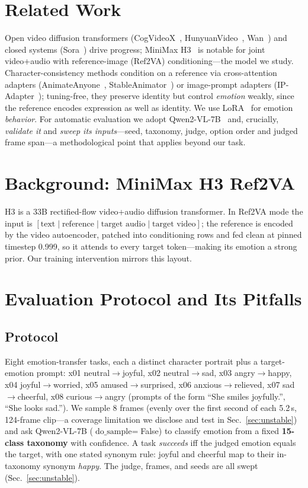 \documentclass[conference]{IEEEtran}
\begin{document}
\section{Related Work}
Open video diffusion transformers (CogVideoX~\cite{cogvideox2024}, HunyuanVideo~\cite{hunyuan2024},
Wan~\cite{wan2025}) and closed systems (Sora~\cite{sora2024}) drive progress; MiniMax
H3~\cite{minimax2025} is notable for joint video+audio with reference-image (Ref2VA) conditioning---the
model we study. Character-consistency methods condition on a reference via cross-attention adapters
(AnimateAnyone~\cite{animateanyone2023}, StableAnimator~\cite{stableanimator2024}) or image-prompt
adapters (IP-Adapter~\cite{ipadapter2023}); tuning-free, they preserve identity but control
\emph{emotion} weakly, since the reference encodes expression as well as identity. We use
LoRA~\cite{lora2021,dreambooth2022} for emotion \emph{behavior}. For automatic evaluation we adopt
Qwen2-VL-7B~\cite{qwen2vl2024} and, crucially, \emph{validate it} and \emph{sweep its inputs}---seed,
taxonomy, judge, option order and judged frame span---a methodological point that applies beyond our
task.

\section{Background: MiniMax H3 Ref2VA}
H3 is a 33B rectified-flow video+audio diffusion transformer. In Ref2VA mode the input is
$[\text{text}\mid\text{reference}\mid\text{target audio}\mid\text{target video}]$; the reference is
encoded by the video autoencoder, patched into conditioning rows and fed clean at pinned timestep
0.999, so it attends to every target token---making its emotion a strong prior. Our training
intervention mirrors this layout.

\section{Evaluation Protocol and Its Pitfalls}
\label{sec:proto}
\subsection{Protocol}
Eight emotion-transfer tasks, each a distinct character portrait plus a target-emotion prompt:
x01 neutral$\rightarrow$joyful, x02 neutral$\rightarrow$sad, x03 angry$\rightarrow$happy,
x04 joyful$\rightarrow$worried, x05 amused$\rightarrow$surprised, x06 anxious$\rightarrow$relieved,
x07 sad$\rightarrow$cheerful, x08 curious$\rightarrow$angry (prompts of the form ``She smiles
joyfully.'', ``She looks sad.''). We sample 8 frames (evenly over the first second of each 5.2\,s, 124-frame
clip---a coverage limitation we disclose and test in Sec.~\ref{sec:unstable}) and ask Qwen2-VL-7B
($\text{do\_sample}=$False) to classify emotion from a fixed \textbf{15-class taxonomy} with confidence. A task \emph{succeeds}
iff the judged emotion equals the target, with one stated synonym rule: joyful and cheerful map to
their in-taxonomy synonym \emph{happy}. The judge, frames, and seeds are all swept
(Sec.~\ref{sec:unstable}).
\end{document}
